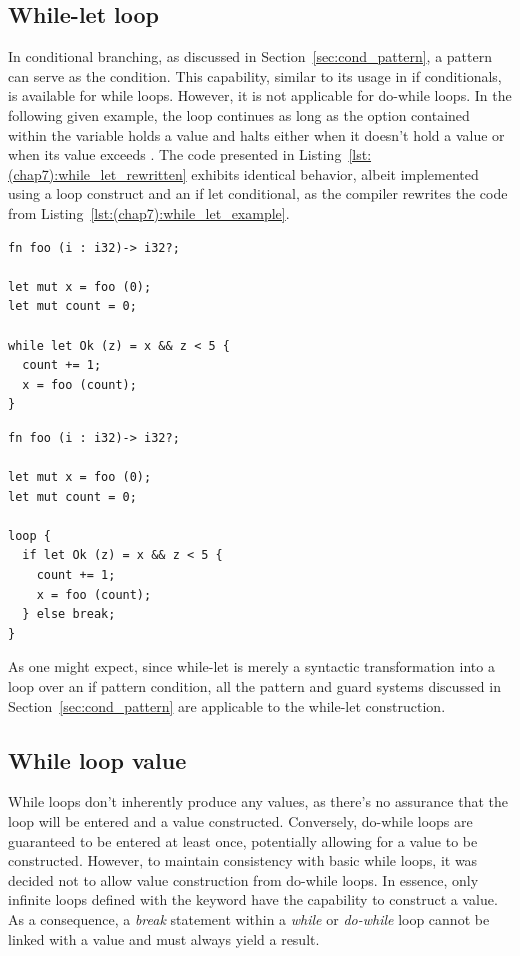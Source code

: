\subsection{While-let loop}
\label{sec:while_let_loop}

In conditional branching, as discussed in Section~\ref{sec:cond_pattern}, a
pattern can serve as the condition. This capability, similar to its usage in if
conditionals, is available for while loops. However, it is not applicable for
do-while loops. In the following given example, the loop continues as long as
the option contained within the variable  holds a value and halts
either when it doesn't hold a value or when its value exceeds . The
code presented in Listing~\ref{lst:(chap7):while_let_rewritten} exhibits identical
behavior, albeit implemented using a loop construct and an if let conditional,
as the compiler rewrites the code from Listing~\ref{lst:(chap7):while_let_example}.

\begin{lstlisting}[style=coloredverbatim, caption=While-let example, label=lst:(chap7):while_let_example]
fn foo (i : i32)-> i32?;

let mut x = foo (0);
let mut count = 0;

while let Ok (z) = x && z < 5 {
  count += 1;
  x = foo (count);
}
\end{lstlisting}

\begin{lstlisting}[style=coloredverbatim, caption=While-let rewritten using loop and if-let, label=lst:(chap7):while_let_rewritten]
fn foo (i : i32)-> i32?;

let mut x = foo (0);
let mut count = 0;

loop {
  if let Ok (z) = x && z < 5 {
    count += 1;
    x = foo (count);
  } else break;
}
\end{lstlisting}

As one might expect, since while-let is merely a syntactic transformation into a
loop over an if pattern condition, all the pattern and guard systems discussed
in Section~\ref{sec:cond_pattern} are applicable to the while-let construction.

\subsection{While loop value}

While loops don't inherently produce any values, as there's no assurance that
the loop will be entered and a value constructed. Conversely, do-while loops are
guaranteed to be entered at least once, potentially allowing for a value to be
constructed. However, to maintain consistency with basic while loops, it was
decided not to allow value construction from do-while loops. In essence, only
infinite loops defined with the  keyword have the capability to
construct a value. As a consequence, a \textit{break} statement within a
\textit{while} or \textit{do-while} loop cannot be linked with a value and must
always yield a  result.


\vfill%
\pagebreak
